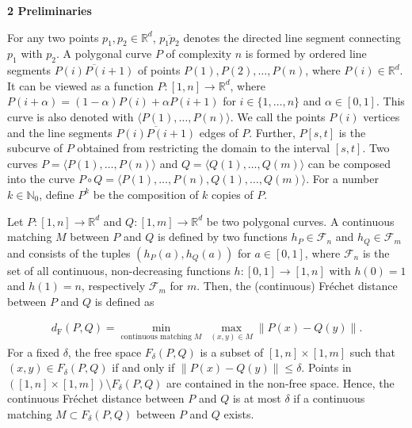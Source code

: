 \documentclass[10pt,a4paper]{article}
\begin{document}
\par
\par
\par\medskip\noindent\textbf{2 Preliminaries}\par
For any two points $p_{1},p_{2}\in\mathbb{R}^{d}$, $\overline{p_{1}p_{2}}$ denotes the directed line segment connecting $p_{1}$ with $p_{2}$. A polygonal curve $P$ of complexity $n$ is formed by ordered line segments $\overline{P(i)P(i+1)}$ of points $P(1),P(2),\dotso,P(n)$, where $P(i)\in\mathbb{R}^{d}$. It can be viewed as a function $P:[1,n]\rightarrow\mathbb{R}^{d}$, where $P(i+\alpha)=(1-\alpha)P(i)+\alpha P(i+1)$ for $i\in\{1,\dotso,n\}$ and $\alpha\in[0,1]$. This curve is also denoted with $\langle P(1),\dotso,P(n)\rangle$. We call the points $P(i)$ vertices and the line segments $\overline{P(i)P(i+1)}$ edges of $P$. Further, $P[s,t]$ is the subcurve of $P$ obtained from restricting the domain to the interval $[s,t]$. Two curves $P=\langle P(1),\dots,P(n)\rangle$ and $Q=\langle Q(1),\dots,Q(m)\rangle$ can be composed into the curve $P\circ Q=\langle P(1),\dots,P(n),Q(1),\dots,Q(m)\rangle$. For a number $k\in\mathbb{N}_{0}$, define $P^{k}$ be the composition of $k$ copies of $P$.
\par
\par
Let $P:[1,n]\rightarrow\mathbb{R}^{d}$ and ${Q:[1,m]\rightarrow\mathbb{R}^{d}}$ be two polygonal curves. A continuous matching $M$ between $P$ and $Q$ is defined by two functions $h_{P}\in\mathcal{F}_{n}$ and $h_{Q}\in\mathcal{F}_{m}$ and consists of the tuples $(h_{P}(a),h_{Q}(a))$ for $a\in[0,1]$, where $\mathcal{F}_{n}$ is the set of all continuous, non-decreasing functions $h:[0,1]\rightarrow[1,n]$ with ${h(0)=1}$ and $h(1)=n$, respectively $\mathcal{F}_{m}$ for $m$. Then, the (continuous) Fréchet distance between $P$ and $Q$ is defined as
\par
\[\begin{aligned}
d_{\text{F}}(P,Q)=\min_{\text{continuous matching }M}\ \max_{(x,y)\in M}\|P(x)%
-Q(y)\|.
\end{aligned}\]
For a fixed $\delta$, the free space $F_{\delta}(P,Q)$ is a subset of $[1,n]\times[1,m]$ such that $(x,y)\in F_{\delta}(P,Q)$ if and only if $\|P(x)-Q(y)\|\leq\delta$. Points in $([1,n]\times[1,m])\setminus F_{\delta}(P,Q)$ are contained in the non-free space. Hence, the continuous Fréchet distance between $P$ and $Q$ is at most $\delta$ if a continuous matching $M\subset F_{\delta}(P,Q)$ between $P$ and $Q$ exists.
\end{document}
